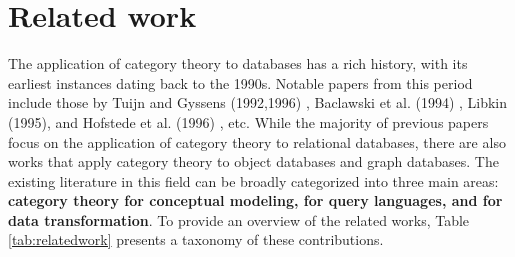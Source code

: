 \section{Related work}
\label{sec:relatedwork}










The application of category theory to databases has a rich history, with its earliest instances dating back to the 1990s. Notable papers from this period include those by Tuijn and Gyssens (1992,1996) \cite{conf/icdt/TuijnG92,journals/tcs/TuijnG96}, Baclawski et al. (1994) \cite{journals/mscs/BaclawskiSW94}, Libkin (1995)\cite{DBLP:conf/icdt/Libkin95},  and Hofstede et al. (1996) \cite{journals/cj/HofstedeLF96}, etc. While the majority of previous papers focus on the application of category theory to relational databases, there are also works that apply category theory to object databases and graph databases. The existing literature in this field can be broadly categorized into three main areas: \textbf{category theory for conceptual modeling,  for query languages, and for data transformation}. To provide an overview of the related works, Table \ref{tab:relatedwork} presents a taxonomy of these contributions.




